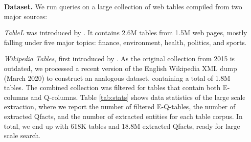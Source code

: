 \vspace{0.1cm}
\noindent \textbf{Dataset.}
We run queries on a large collection of web tables
compiled from two major sources:
\squishlist
\item \textit{TableL} was introduced by \cite{DBLP:conf/icde/IbrahimRWZ19}.
It contains 2.6M tables from 1.5M web pages, mostly falling under five major topics: finance, environment, health, politics, and sports.
\item \textit{Wikipedia Tables}, first introduced by \cite{DBLP:conf/semweb/BhagavatulaND15}. 
As the original collection from 2015 is outdated,
we processed a recent version of the English Wikipedia XML dump (March 2020) 
to construct an analogous dataset, containing a total of 1.8M tables.
%
\squishend
The combined collection was filtered for tables that
contain both E-columns and Q-columns.
Table \ref{tab:stats} shows data statistics
of the large scale extraction, where we report the number of filtered E-Q-tables, the number of extracted Qfacts, and the number of extracted entities for each table corpus.
In total, we end up with 618K tables and 18.8M extracted Qfacts, ready for large scale search.




